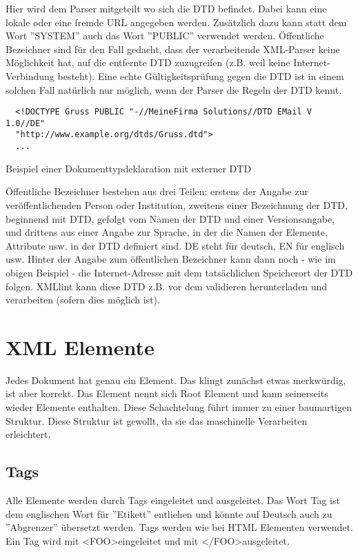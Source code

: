 Hier wird dem Parser mitgeteilt wo sich die DTD befindet. Dabei kann eine lokale oder eine fremde URL angegeben werden.
Zusätzlich dazu kann statt dem Wort ''SYSTEM'' auch das Wort ''PUBLIC'' verwendet werden. Öffentliche Bezeichner sind
für den Fall gedacht, dass der verarbeitende XML-Parser keine Möglichkeit hat, auf die entfernte DTD zuzugreifen (z.B.
weil keine Internet-Verbindung besteht). Eine echte Gültigkeitsprüfung gegen die DTD ist in einem solchen Fall natürlich
nur möglich, wenn der Parser die Regeln der DTD kennt.

\begin{listing}[H]
\begin{verbatim}
  <!DOCTYPE Gruss PUBLIC "-//MeineFirma Solutions//DTD EMail V 1.0//DE" 
  "http://www.example.org/dtds/Gruss.dtd">
  ...
\end{verbatim}
\caption{Beispiel einer Dokumenttypdeklaration mit externer DTD}
\end{listing}

Öffentliche Bezeichner bestehen aus drei Teilen: erstens der Angabe zur veröffentlichenden Person oder Institution,
zweitens einer Bezeichnung der DTD, beginnend mit DTD, gefolgt vom Namen der DTD und einer Versionsangabe, und drittens
aus einer Angabe zur Sprache, in der die Namen der Elemente, Attribute usw. in der DTD definiert sind. DE steht für
deutsch, EN für englisch usw. Hinter der Angabe zum öffentlichen Bezeichner kann dann noch - wie im obigen Beispiel -
die Internet-Adresse mit dem tatsächlichen Speicherort der DTD folgen.
XMLlint kann diese DTD z.B. vor dem validieren herunterladen und verarbeiten (sofern dies möglich ist).

\section{XML Elemente}
Jedes Dokument hat genau ein Element. Das klingt zunächst etwas merkwürdig, ist aber korrekt. Das Element nennt sich
Root Element und kann seinerseits wieder Elemente enthalten. Diese Schachtelung führt immer zu einer baumartigen
Struktur. Diese Struktur ist gewollt, da sie das maschinelle Verarbeiten erleichtert.
\subsection{Tags}
Alle Elemente werden durch Tags eingeleitet und ausgeleitet. Das Wort Tag ist dem englischen Wort für ''Etikett''
entliehen und könnte auf Deutsch auch zu ''Abgrenzer'' übersetzt werden.
Tags werden wie bei HTML Elementen verwendet. Ein Tag wird mit \textless FOO\textgreater eingeleitet und mit
\textless/FOO\textgreater ausgeleitet.

